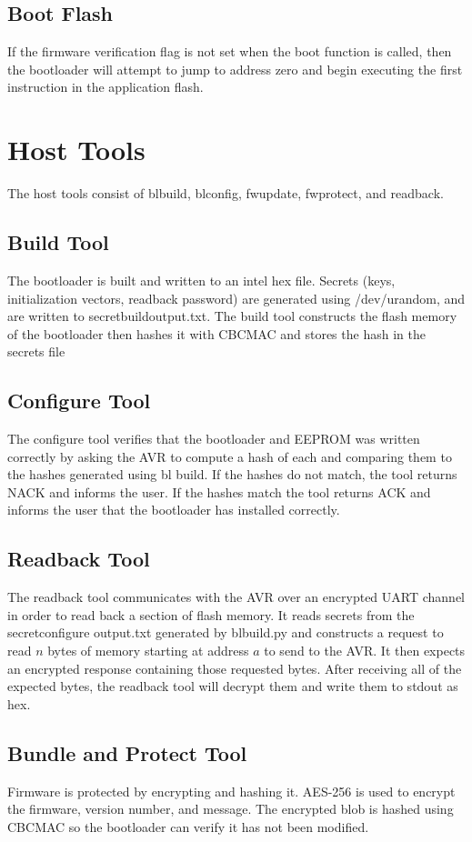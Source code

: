 \documentclass[11pt]{article}
\begin{document}
\subsection{Boot Flash}
If the firmware verification flag is not set when the boot function is called, then the bootloader will attempt to jump to address zero and begin executing the first instruction in the application flash.
\section{Host Tools}
The host tools consist of bl\textunderscore build, bl\textunderscore config, fw\textunderscore update, fw\textunderscore protect, and readback.
\subsection{Build Tool}
The bootloader is built and written to an intel hex file. Secrets (keys, initialization vectors, readback password) are generated using /dev/urandom, and are written to secret\textunderscore build\textunderscore output.txt.
The build tool constructs the flash memory of the bootloader then hashes it with CBCMAC and stores the hash in the secrets file 
\subsection{Configure Tool}
The configure tool verifies that the bootloader and EEPROM was written correctly by asking the AVR to compute a hash of each and comparing them to the hashes generated using bl \textunderscore build. If the hashes do not match, the tool returns NACK and informs the user. If the hashes match the tool returns ACK and informs the user that the bootloader has installed correctly.
\subsection{Readback Tool}
The readback tool communicates with the AVR over an encrypted UART channel in order to read back a section of flash memory. It reads secrets from the secret\textunderscore configure \textunderscore output.txt generated by bl\textunderscore build.py and constructs a request to read $n$ bytes of memory starting at address $a$ to send to the AVR. It then expects an encrypted response containing those requested bytes. After receiving all of the expected bytes, the readback tool will decrypt them and write them to stdout as hex. 
\subsection{Bundle and Protect Tool}
Firmware is protected by encrypting and hashing it. AES-256 is used to encrypt the firmware, version number, and message. The encrypted blob is hashed using CBCMAC so the bootloader can verify it has not been modified.
\end{document}
